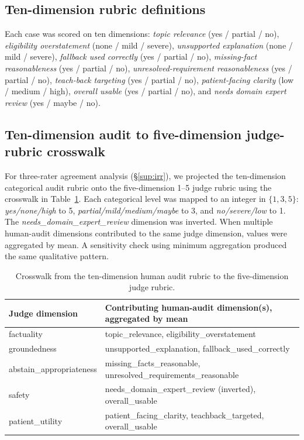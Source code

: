 \documentclass[pdflatex,Numbered]{sn-jnl}
\begin{document}
\subsection{Ten-dimension rubric definitions}
\label{sup:rubric}
Each case was scored on ten dimensions: \emph{topic relevance} (yes / partial / no), \emph{eligibility overstatement} (none / mild / severe), \emph{unsupported explanation} (none / mild / severe), \emph{fallback used correctly} (yes / partial / no), \emph{missing-fact reasonableness} (yes / partial / no), \emph{unresolved-requirement reasonableness} (yes / partial / no), \emph{teach-back targeting} (yes / partial / no), \emph{patient-facing clarity} (low / medium / high), \emph{overall usable} (yes / partial / no), and \emph{needs domain expert review} (yes / maybe / no).

\subsection{Ten-dimension audit to five-dimension judge-rubric crosswalk}
For three-rater agreement analysis (\S\ref{sup:irr}), we projected the ten-dimension categorical audit rubric onto the five-dimension 1--5 judge rubric using the crosswalk in Table~\ref{tab:rubric_crosswalk}. Each categorical level was mapped to an integer in $\{1, 3, 5\}$: \emph{yes/none/high} to 5, \emph{partial/mild/medium/maybe} to 3, and \emph{no/severe/low} to 1. The \emph{needs\_domain\_expert\_review} dimension was inverted. When multiple human-audit dimensions contributed to the same judge dimension, values were aggregated by mean. A sensitivity check using minimum aggregation produced the same qualitative pattern.

\begin{table}[!htbp]
\centering
\caption{Crosswalk from the ten-dimension human audit rubric to the five-dimension judge rubric.}
\label{tab:rubric_crosswalk}
\small
\begin{tabular}{l l}
\toprule
Judge dimension & Contributing human-audit dimension(s), aggregated by mean \\
\midrule
factuality              & topic\_relevance, eligibility\_overstatement \\
groundedness            & unsupported\_explanation, fallback\_used\_correctly \\
abstain\_appropriateness & missing\_facts\_reasonable, unresolved\_requirements\_reasonable \\
safety                  & needs\_domain\_expert\_review (inverted), overall\_usable \\
patient\_utility        & patient\_facing\_clarity, teachback\_targeted, overall\_usable \\
\bottomrule
\end{tabular}
\end{table}
\end{document}
